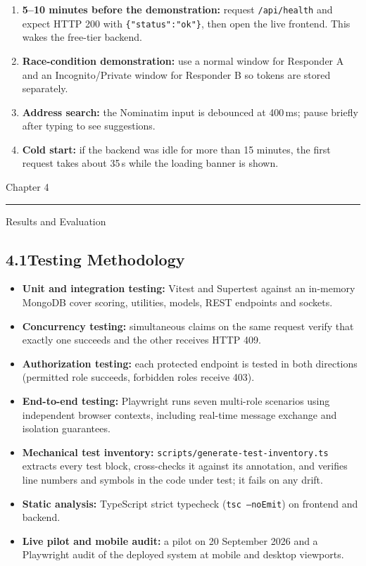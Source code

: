 \documentclass[11pt,a4paper]{article}
\newcommand{\chaptertitle}[2]{%
  \vspace*{0pt}%
  {\normalfont\fontsize{22}{25}\selectfont #1\par}%
  \vspace{2pt}%
  \noindent\rule{\textwidth}{0.7pt}\par
  \vspace{7pt}%
  {\normalfont\fontsize{22}{25}\selectfont #2\par}
  \vspace{5pt}%
}
\newcommand{\tc}[1]{\texttt{\small #1}}
\begin{document}
\begin{enumerate}
\item \textbf{5--10 minutes before the demonstration:} request \tc{/api/health} and expect HTTP 200 with \tc{\{"status":"ok"\}}, then open the live frontend. This wakes the free-tier backend.
\item \textbf{Race-condition demonstration:} use a normal window for Responder A and an Incognito/Private window for Responder B so tokens are stored separately.
\item \textbf{Address search:} the Nominatim input is debounced at 400\,ms; pause briefly after typing to see suggestions.
\item \textbf{Cold start:} if the backend was idle for more than 15 minutes, the first request takes about 35\,s while the loading banner is shown.
\end{enumerate}

\newpage

\label{ch4}
\chaptertitle{Chapter 4}{Results and Evaluation}

\subsection{4.1\quad Testing Methodology}\label{s41}

\begin{itemize}
\item \textbf{Unit and integration testing:} Vitest and Supertest against an in-memory MongoDB cover scoring, utilities, models, REST endpoints and sockets.
\item \textbf{Concurrency testing:} simultaneous claims on the same request verify that exactly one succeeds and the other receives HTTP 409.
\item \textbf{Authorization testing:} each protected endpoint is tested in both directions (permitted role succeeds, forbidden roles receive 403).
\item \textbf{End-to-end testing:} Playwright runs seven multi-role scenarios using independent browser contexts, including real-time message exchange and isolation guarantees.
\item \textbf{Mechanical test inventory:} \tc{scripts/generate-test-inventory.ts} extracts every test block, cross-checks it against its annotation, and verifies line numbers and symbols in the code under test; it fails on any drift.
\item \textbf{Static analysis:} TypeScript strict typecheck (\tc{tsc --noEmit}) on frontend and backend.
\item \textbf{Live pilot and mobile audit:} a pilot on 20 September 2026 and a Playwright audit of the deployed system at mobile and desktop viewports.
\end{itemize}
\end{document}
